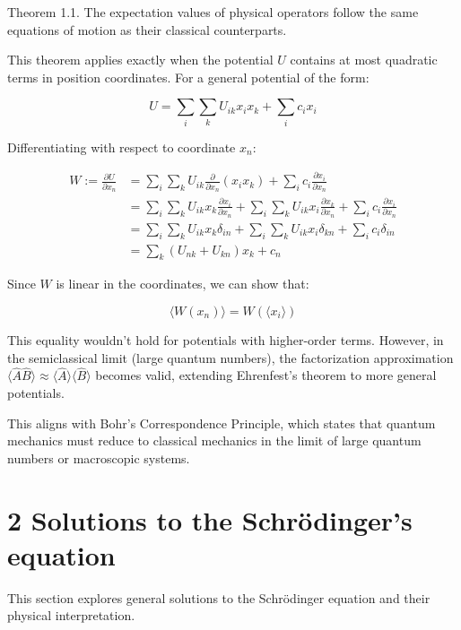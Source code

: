 \documentclass[italian]{HKNdocument}
\begin{document}
Theorem 1.1. The expectation values of physical operators follow the same equations of motion as their classical counterparts.

This theorem applies exactly when the potential $U$ contains at most quadratic terms in position coordinates. For a general potential of the form:

\begin{equation*}
U = \sum_i \sum_k U_{ik}x_i x_k + \sum_i c_i x_i \tag{1.95}
\end{equation*}

Differentiating with respect to coordinate $x_n$:

\begin{align*}
W := \frac{\partial U}{\partial x_n} &= \sum_i \sum_k U_{ik}\frac{\partial}{\partial x_n}(x_i x_k) + \sum_i c_i \frac{\partial x_i}{\partial x_n} \\
&= \sum_i \sum_k U_{ik}x_k\frac{\partial x_i}{\partial x_n} + \sum_i \sum_k U_{ik}x_i\frac{\partial x_k}{\partial x_n} + \sum_i c_i\frac{\partial x_i}{\partial x_n} \\
&= \sum_i \sum_k U_{ik}x_k\delta_{in} + \sum_i \sum_k U_{ik}x_i\delta_{kn} + \sum_i c_i\delta_{in} \\
&= \sum_k(U_{nk} + U_{kn})x_k + c_n \tag{1.96}
\end{align*}

Since $W$ is linear in the coordinates, we can show that:

\begin{equation*}
\langle W(x_n)\rangle = W(\langle x_i\rangle) \tag{1.97}
\end{equation*}

This equality wouldn't hold for potentials with higher-order terms. However, in the semiclassical limit (large quantum numbers), the factorization approximation $\langle\hat{A}\hat{B}\rangle \approx \langle\hat{A}\rangle\langle\hat{B}\rangle$ becomes valid, extending Ehrenfest's theorem to more general potentials.

This aligns with Bohr's Correspondence Principle, which states that quantum mechanics must reduce to classical mechanics in the limit of large quantum numbers or macroscopic systems.

\section*{2 Solutions to the Schrödinger's equation}

This section explores general solutions to the Schrödinger equation and their physical interpretation.
\end{document}
